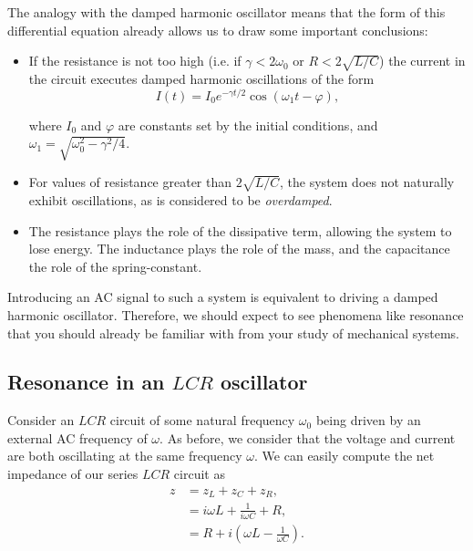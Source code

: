 The analogy with the damped harmonic oscillator means that the form of this differential equation already allows us to draw some important conclusions:
\begin{itemize}
    \item If the resistance is not too high (i.e. if $\gamma < 2 \omega_0$ or $R < 2 \sqrt{L/C}$) the current in the circuit executes damped harmonic oscillations of the form
    \begin{equation}
        I(t) = I_0 e^{-\gamma t/2} \cos(\omega_1 t - \varphi),
    \end{equation}

    where $I_0$ and $\varphi$ are constants set by the initial conditions, and $\omega_1 = \sqrt{\omega_0^2 - \gamma^2/4}$.

    \item For values of resistance greater than $2 \sqrt{L/C}$, the system does not naturally exhibit oscillations, as is considered to be \textsl{overdamped}.

    \item The resistance plays the role of the dissipative term, allowing the system to lose energy. The inductance plays the role of the mass, and the capacitance the role of the spring-constant.
\end{itemize}

Introducing an AC signal to such a system is equivalent to driving a damped harmonic oscillator. Therefore, we should expect to see phenomena like resonance that you should already be familiar with from your study of mechanical systems.

\subsection*{Resonance in an $LCR$ oscillator}
Consider an $LCR$ circuit of some natural frequency $\omega_0$ being driven by an external AC frequency of $\omega$. As before, we consider that the voltage and current are both oscillating at the same frequency $\omega$. We can easily compute the net impedance of our series $LCR$ circuit as
\begin{equation}
    \begin{aligned}
        z &= z_L + z_C + z_R,\\
          &= i\omega L + \frac{1}{i\omega C} + R,\\ 
          &= R + i \left( \omega L - \frac{1}{\omega C} \right).
    \end{aligned}
\end{equation}

